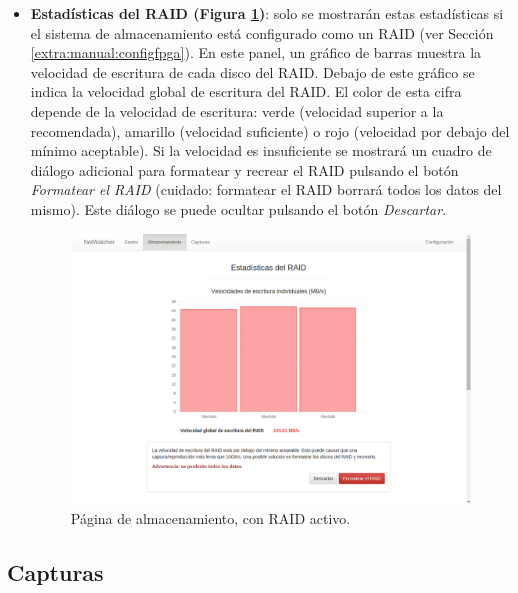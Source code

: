 \begin{itemize}
\item \textbf{Estadísticas del \gls{RAID} (Figura \ref{fig:captura:raid})}: solo se mostrarán estas estadísticas si el sistema de almacenamiento está configurado como un \gls{RAID} (ver Sección \ref{extra:manual:configfpga}). En este panel, un gráfico de barras muestra la velocidad de escritura de cada disco del \gls{RAID}. Debajo de este gráfico se indica la velocidad global de escritura del \gls{RAID}. El color de esta cifra depende de la velocidad de escritura: verde (velocidad superior a la recomendada), amarillo (velocidad suficiente) o rojo (velocidad por debajo del mínimo aceptable). Si la velocidad es insuficiente se mostrará un cuadro de diálogo adicional para formatear y recrear el \gls{RAID} pulsando el botón \textit{Formatear el \gls{RAID}} (cuidado: formatear el \gls{RAID} borrará todos los datos del mismo). Este diálogo se puede ocultar pulsando el botón \textit{Descartar}.
\begin{figure}[!htp]
  \centering
  \includegraphics[width=\textwidth,clip=true]{graphics/capturas/almacenamiento_raid}
  \caption{Página de almacenamiento, con \gls{RAID} activo.}
  \label{fig:captura:raid}
\end{figure}
\end{itemize}


\subsection{Capturas\label{extra:manual:capturas}}


